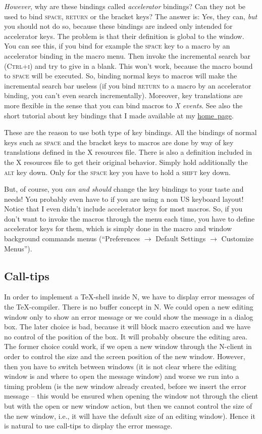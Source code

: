 \documentclass{article}
\newcommand{\nedit}{N\kern-0.8pt{Edit}}
\newcommand{\keyname}[1]{\textsc{#1}}
\newcommand{\menu}[1]{``#1''}
\begin{document}
\emph{However}, why are these bindings called \emph{accelerator} bindings? Can they not be used to bind \keyname{space, return} or the bracket keys? The answer is: Yes, they can, \emph{but} you should not do so, because these bindings are indeed only intended for accelerator keys. The problem is that their definition is global to the window. You can see this, if you bind for example the \keyname{space} key to a macro by an accelerator binding in the macro menu. Then invoke the incremental search bar (\keyname{Ctrl+i}) and try to give in a blank. This won't work, because the macro bound to \keyname{space} will be executed. So, binding normal keys to macros will make the incremental search bar useless (if you bind \keyname{return} to a macro by an accelerator binding, you can't even search incrementally).
Moreover, key translations are more flexible in the sense that you can bind macros to \emph{X events}. See also the short tutorial about key bindings that I made available at my \href{http://nedit.gmxhome.de/macros/keybinding.html}{home~page}.

These are the reason to use both type of key bindings. All the bindings of normal keys such as \keyname{space} and the bracket keys to macros are done by way of key translations defined in the X resources file. There is also a definition included in the X resources file to get their original behavior. Simply hold additionally the \keyname{alt} key down. Only for the \keyname{space} key you have to hold a \keyname{shift} key down.

But, of course, you \emph{can and should} change the key bindings to your taste and needs! You probably even have to if you are using a non US keyboard layout! Notice that I even didn't include accelerator keys for most macros. So, if you don't want to invoke the macros through the menu each time, you have to define accelerator keys for them, which is simply done in the macro and window background commands menus (\menu{Preferences $\to$ Default Settings $\to$ Customize Menus}).

\subsection{Call-tips}\label{calltips}
In order to implement a \TeX-shell inside \nedit, we have to display error messages of the \TeX-compiler. There is no buffer concept in \nedit. We could open a new editing window only to show an error message or we could show the message in a dialog box. The later choice is bad, because it will block macro execution and we have no control of the position of the box. It will probably obscure the editing area. The former choice could work, if we open a new window through the \nedit-client in order to control the size and the screen position of the new window. However, then you have to switch between windows (it is not clear where the editing window is and where to open the message window) and worse we run into a timing problem (is the new window already created, before we insert the error message -- this would be ensured when opening the window not through the client but with the open or new window action, but then we cannot control the size of the new window, i.e., it will have the default size of an editing window).
Hence it is natural to use call-tips to display the error message.
\end{document}
